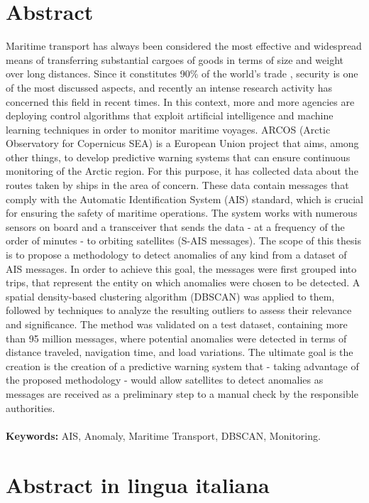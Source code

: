 \documentclass{Configuration_Files/PoliMi3i_thesis}
\begin{document}
\chapter*{Abstract} 
Maritime transport has always been considered the most effective and widespread means of transferring substantial cargoes of goods in terms of size and weight over long distances. Since it constitutes 90\% of the world's trade \cite{trasporto_marittimo}, security is one of the most discussed aspects, and recently an intense research activity has concerned this field in recent times. 
In this context, more and more agencies are deploying control algorithms that exploit artificial intelligence and machine learning techniques in order to monitor maritime voyages. ARCOS (Arctic Observatory for Copernicus SEA) is a European Union project that aims, among other things, to develop predictive warning systems that can ensure continuous monitoring of the Arctic region. For this purpose, it has collected data about the routes taken by ships in the area of concern. These data contain messages that comply with the Automatic Identification System (AIS) standard, which is crucial for ensuring the safety of maritime operations. The system works with numerous sensors on board and a transceiver that sends the data - at a frequency of the order of minutes - to orbiting satellites (S-AIS messages). The scope of this thesis is to propose a methodology to detect anomalies of any kind from a dataset of AIS messages. In order to achieve this goal, the messages were first grouped into trips, that represent the entity on which anomalies were chosen to be detected. A spatial density-based clustering algorithm (DBSCAN) was applied to them, followed by techniques to analyze the resulting outliers to assess their relevance and significance. The method was validated on a test dataset, containing more than 95 million messages, where potential anomalies were detected in terms of distance traveled, navigation time, and load variations. The ultimate goal is the creation is the creation of a predictive warning system that - taking advantage of the proposed methodology - would allow satellites to detect anomalies as messages are received as a preliminary step to a manual check by the responsible authorities.
\\
\\
\textbf{Keywords:} AIS, Anomaly, Maritime Transport, DBSCAN, Monitoring.

\chapter*{Abstract in lingua italiana}
\end{document}

